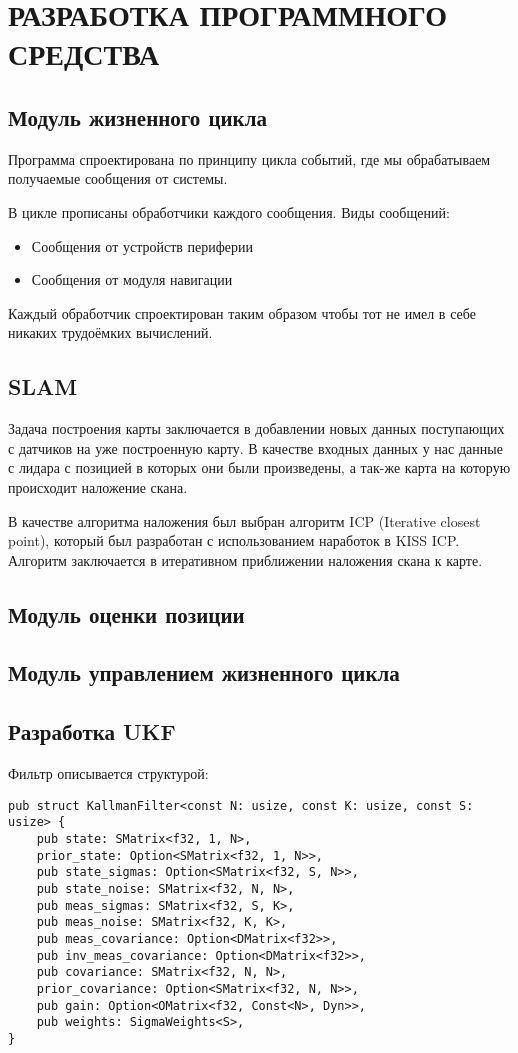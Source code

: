 \section{РАЗРАБОТКА ПРОГРАММНОГО СРЕДСТВА}

\subsection{Модуль жизненного цикла}
Программа спроектирована по принципу цикла событий, где мы обрабатываем получаемые сообщения от системы.

В цикле прописаны обработчики каждого сообщения.
Виды сообщений:
\begin{itemize}
	\item Сообщения от устройств периферии
	\item Сообщения от модуля навигации
\end{itemize}

Каждый обработчик спроектирован таким образом чтобы тот не имел в себе никаких трудоёмких вычислений.

\subsection{SLAM}
Задача построения карты заключается в добавлении новых данных поступающих с датчиков на уже построенную карту.
В качестве входных данных у нас данные с лидара с позицией в которых они были произведены, а так-же карта на которую происходит наложение скана.

В качестве алгоритма наложения был выбран алгоритм ICP (Iterative closest point), который был разработан с использованием наработок в KISS ICP.
Алгоритм заключается в итеративном приближении наложения скана к карте.

\subsection{Модуль оценки позиции}

\subsection{Модуль управлением жизненного цикла}

\subsection{Разработка UKF}
Фильтр описывается структурой:
\begin{lstlisting}
pub struct KallmanFilter<const N: usize, const K: usize, const S: usize> {
    pub state: SMatrix<f32, 1, N>,
    prior_state: Option<SMatrix<f32, 1, N>>,
    pub state_sigmas: Option<SMatrix<f32, S, N>>,
    pub state_noise: SMatrix<f32, N, N>,
    pub meas_sigmas: SMatrix<f32, S, K>,
    pub meas_noise: SMatrix<f32, K, K>,
    pub meas_covariance: Option<DMatrix<f32>>,
    pub inv_meas_covariance: Option<DMatrix<f32>>,
    pub covariance: SMatrix<f32, N, N>,
    prior_covariance: Option<SMatrix<f32, N, N>>,
    pub gain: Option<OMatrix<f32, Const<N>, Dyn>>,
    pub weights: SigmaWeights<S>,
}
\end{lstlisting}


